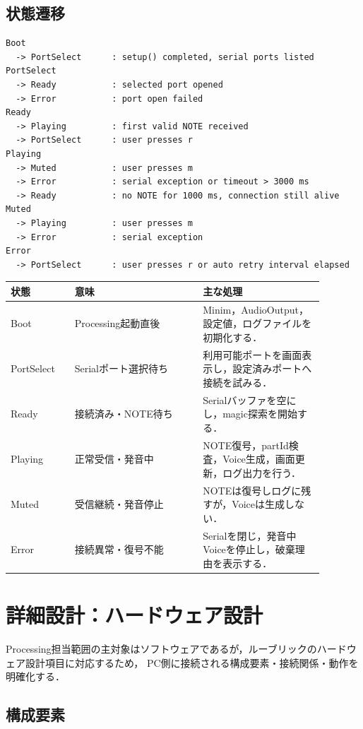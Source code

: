 \documentclass[a4paper,11pt]{jsarticle}
\begin{document}
\subsection{状態遷移}

\begin{lstlisting}[style=textdiagram, caption={Processing音源サブシステムの状態遷移}]
Boot
  -> PortSelect      : setup() completed, serial ports listed
PortSelect
  -> Ready           : selected port opened
  -> Error           : port open failed
Ready
  -> Playing         : first valid NOTE received
  -> PortSelect      : user presses r
Playing
  -> Muted           : user presses m
  -> Error           : serial exception or timeout > 3000 ms
  -> Ready           : no NOTE for 1000 ms, connection still alive
Muted
  -> Playing         : user presses m
  -> Error           : serial exception
Error
  -> PortSelect      : user presses r or auto retry interval elapsed
\end{lstlisting}

\begin{longtable}{p{0.18\linewidth}p{0.36\linewidth}p{0.34\linewidth}}
\toprule
状態 & 意味 & 主な処理 \\
\midrule
\endhead
Boot & Processing起動直後 & Minim，AudioOutput，設定値，ログファイルを初期化する． \\
PortSelect & Serialポート選択待ち & 利用可能ポートを画面表示し，設定済みポートへ接続を試みる． \\
Ready & 接続済み・NOTE待ち & Serialバッファを空にし，magic探索を開始する． \\
Playing & 正常受信・発音中 & NOTE復号，partId検査，Voice生成，画面更新，ログ出力を行う． \\
Muted & 受信継続・発音停止 & NOTEは復号しログに残すが，Voiceは生成しない． \\
Error & 接続異常・復号不能 & Serialを閉じ，発音中Voiceを停止し，破棄理由を表示する． \\
\bottomrule
\end{longtable}

\newpage
\section{詳細設計：ハードウェア設計}

Processing担当範囲の主対象はソフトウェアであるが，ルーブリックのハードウェア設計項目に対応するため，
PC側に接続される構成要素・接続関係・動作を明確化する．

\subsection{構成要素}
\end{document}
